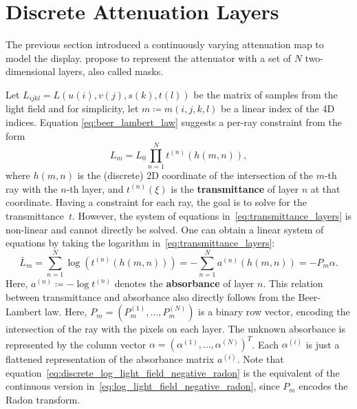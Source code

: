 \section{Discrete Attenuation Layers}

The previous section introduced a continuously varying attenuation map to model the display.
\cite{WetzsteinTomo} propose to represent the attenuator with a set of $N$ two-dimensional layers, also called masks.

Let $L_{ijkl} = L(u(i), v(j), s(k), t(l))$ be the matrix of samples from the light field and for simplicity, let $m \coloneqq m(i, j, k, l)$ be a linear index of the 4D indices.
Equation \ref{eq:beer_lambert_law} suggests a per-ray constraint from the form
\begin{equation}\label{eq:transmittance_layers}
	L_m = L_0 \prod_{n=1}^{N} t^{(n)} (h(m, n)), 
\end{equation}
where $h(m, n)$ is the (discrete) 2D coordinate of the intersection of the \mbox{$m$-th} ray with the \mbox{$n$-th} layer, and $t^{(n)}(\xi)$ is the \textbf{transmittance} of layer $n$ at that coordinate.
Having a constraint for each ray, the goal is to solve for the transmittance~$t$.
However, the system of equations in~\ref{eq:transmittance_layers} is non-linear and cannot directly be solved.
One can obtain a linear system of equations by taking the logarithm in~\ref{eq:transmittance_layers}:
\begin{equation}\label{eq:discrete_log_light_field_negative_radon}
	\bar{L}_m 	=	\sum_{n = 1}^{N}
					\log \left( t^{(n)} (h(m, n)) \right) 
				= 	-\sum_{n = 1}^{N} a^{(n)} (h(m, n)) 
				= -P_m \alpha.
\end{equation}
Here, $a^{(n)} \coloneqq -\log t^{(n)}$ denotes the \textbf{absorbance} of layer $n$. 
This relation between transmittance and absorbance also directly follows from the Beer-Lambert law.
Here, $P_m = \left( P_m^{(1)}, \dots, P_m^{(N)} \right)$ is a binary row vector, encoding the intersection of the ray with the pixels on each layer.
The unknown absorbance is represented by the column vector $\alpha = \left( \alpha^{(1)}, \dots, \alpha^{(N)} \right)^T$.
Each $\alpha^{(i)}$ is just a flattened representation of the absorbance matrix $a^{(i)}$.
Note that equation~\ref{eq:discrete_log_light_field_negative_radon} is the equivalent of the continuous version in~\ref{eq:log_light_field_negative_radon}, since $P_m$ encodes the Radon transform.
